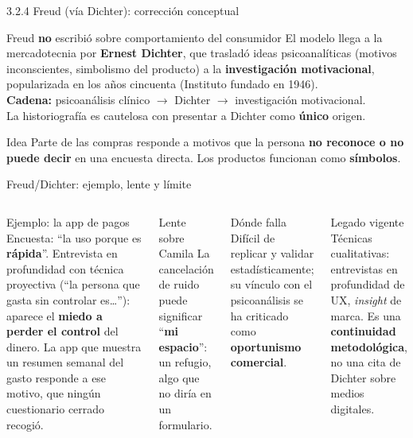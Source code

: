 \documentclass[aspectratio=169,xcolor=dvipsnames]{beamer}
\begin{document}
\begin{frame}{3.2.4 Freud (vía Dichter): corrección conceptual}
\begin{alertblock}{Freud \textbf{no} escribió sobre comportamiento del consumidor}
  \small El modelo llega a la mercadotecnia por \textbf{Ernest Dichter}, que trasladó ideas psicoanalíticas (motivos inconscientes, simbolismo del producto) a la \textbf{investigación motivacional}, popularizada en los años cincuenta (Instituto fundado en 1946).\\[3pt]
  \textbf{Cadena:} psicoanálisis clínico $\rightarrow$ Dichter $\rightarrow$ investigación motivacional.\\[3pt]
  La historiografía es cautelosa con presentar a Dichter como \textbf{único} origen.
\end{alertblock}
\begin{block}{Idea}
  \small Parte de las compras responde a motivos que la persona \textbf{no reconoce o no puede decir} en una encuesta directa. Los productos funcionan como \textbf{símbolos}.
\end{block}
\end{frame}

\begin{frame}{Freud/Dichter: ejemplo, lente y límite}
\begin{columns}[T]
  \begin{exampleblock}{Ejemplo: la app de pagos}
    \footnotesize Encuesta: \enquote{la uso porque es \textbf{rápida}}. Entrevista en profundidad con técnica proyectiva (\enquote{la persona que gasta sin controlar es\ldots}): aparece el \textbf{miedo a perder el control} del dinero. La app que muestra un resumen semanal del gasto responde a ese motivo, que ningún cuestionario cerrado recogió.
  \end{exampleblock}
  \begin{alertblock}{Lente sobre Camila}
    \small La cancelación de ruido puede significar \enquote{\textbf{mi espacio}}: un refugio, algo que no diría en un formulario.
  \end{alertblock}
  \begin{block}{Dónde falla}
    \footnotesize Difícil de replicar y validar estadísticamente; su vínculo con el psicoanálisis se ha criticado como \textbf{oportunismo comercial}.
  \end{block}
  \begin{block}{Legado vigente}
    \footnotesize Técnicas cualitativas: entrevistas en profundidad de UX, \textit{insight} de marca. Es una \textbf{continuidad metodológica}, no una cita de Dichter sobre medios digitales.
  \end{block}
\end{columns}
\end{frame}
\end{document}
